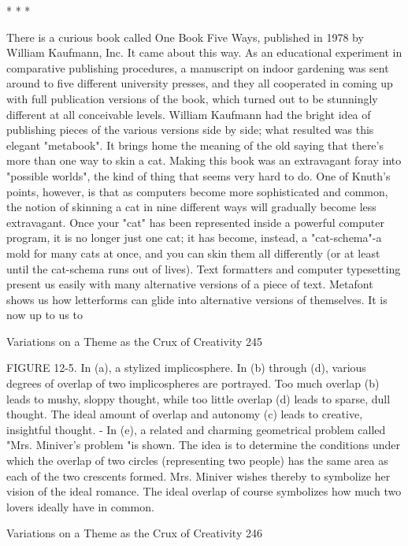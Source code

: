                                         *   *   *

        There is a curious book called One Book Five Ways, published in 1978 by
William Kaufmann, Inc. It came about this way. As an educational experiment in
comparative publishing procedures, a manuscript on indoor gardening was sent
around to five different university presses, and they all cooperated in coming up with
full publication versions of the book, which turned out to be stunningly different at all
conceivable levels. William Kaufmann had the bright idea of publishing pieces of the
various versions side by side; what resulted was this elegant "metabook". It brings
home the meaning of the old saying that there's more than one way to skin a cat.
        Making this book was an extravagant foray into "possible worlds", the kind of
thing that seems very hard to do. One of Knuth's points, however, is that as computers
become more sophisticated and common, the notion of skinning a cat in nine different
ways will gradually become less extravagant. Once your "cat" has been represented
inside a powerful computer program, it is no longer just one cat; it has become,
instead, a "cat-schema"-a mold for many cats at once, and you can skin them all
differently (or at least until the cat-schema runs out of lives).
        Text formatters and computer typesetting present us easily with many
alternative versions of a piece of text. Metafont shows us how letterforms can glide
into alternative versions of themselves. It is now up to us to




Variations on a Theme as the Crux of Creativity                                       245

FIGURE 12-5. In (a), a stylized implicosphere. In (b) through (d), various degrees of
overlap of two implicospheres are portrayed. Too much overlap (b) leads to mushy,
sloppy thought, while too little overlap (d) leads to sparse, dull thought. The ideal
amount of overlap and autonomy (c) leads to creative, insightful thought. -
       In (e), a related and charming geometrical problem called "Mrs. Miniver's
problem "is shown. The idea is to determine the conditions under which the overlap of
two circles (representing two people) has the same area as each of the two crescents
formed. Mrs. Miniver wishes thereby to symbolize her vision of the ideal romance.
The ideal overlap of course symbolizes how much two lovers ideally have in common.


Variations on a Theme as the Crux of Creativity                                  246

